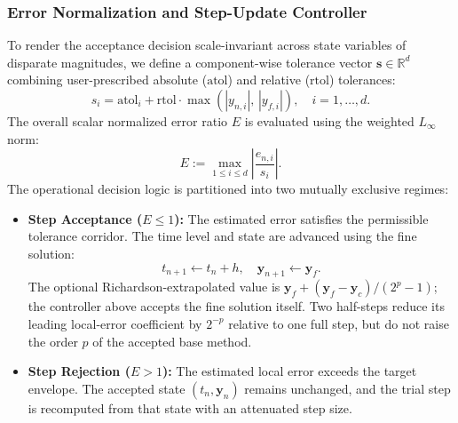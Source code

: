 \documentclass[11pt,a4paper]{article}
\theoremstyle{definition}
\theoremstyle{remark}
\begin{document}
\subsubsection{Error Normalization and Step-Update Controller}
To render the acceptance decision scale-invariant across state variables of disparate magnitudes, we define a component-wise tolerance vector $\mathbf{s} \in \mathbb{R}^d$ combining user-prescribed absolute ($\text{atol}$) and relative ($\text{rtol}$) tolerances:
\begin{equation}
\label{eq:scale_vector}
s_i = \text{atol}_i + \text{rtol} \cdot \max\left(|y_{n, i}|, \, |y_{f, i}|\right), \quad i = 1, \dots, d.
\end{equation}
The overall scalar normalized error ratio $E$ is evaluated using the weighted $L_\infty$ norm:
\begin{equation}
\label{eq:normalized_error_ratio}
E := \max_{1 \le i \le d} \left| \frac{\hat{e}_{n, i}}{s_i} \right|.
\end{equation}
The operational decision logic is partitioned into two mutually exclusive regimes:
\begin{itemize}
    \item \textbf{Step Acceptance ($E \le 1$):} The estimated error satisfies the permissible tolerance corridor. The time level and state are advanced using the fine solution:
    \begin{equation}
    \label{eq:accepted_fine_solution}
    t_{n+1} \gets t_n + h, \quad \mathbf{y}_{n+1} \gets \mathbf{y}_f.
    \end{equation}
    The optional Richardson-extrapolated value is $\mathbf{y}_f+(\mathbf{y}_f-\mathbf{y}_c)/(2^p-1)$; the controller above accepts the fine solution itself. Two half-steps reduce its leading local-error coefficient by $2^{-p}$ relative to one full step, but do not raise the order $p$ of the accepted base method.
    \item \textbf{Step Rejection ($E > 1$):} The estimated local error exceeds the target envelope. The accepted state $(t_n,\mathbf{y}_n)$ remains unchanged, and the trial step is recomputed from that state with an attenuated step size.
\end{itemize}
\end{document}
